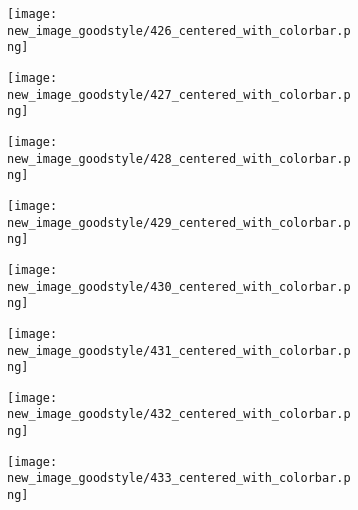 \documentclass[a4paper,12pt]{article}
\begin{document}
\begin{figure}[H]
  \begin{subfigure}{0.11\textwidth}
    \texttt{[image: new\_image\_goodstyle/426\_centered\_with\_colorbar.png]}
  \end{subfigure}
  \hfill
  \begin{subfigure}{0.11\textwidth}
    \texttt{[image: new\_image\_goodstyle/427\_centered\_with\_colorbar.png]}
  \end{subfigure}
  \hfill
  \begin{subfigure}{0.11\textwidth}
    \texttt{[image: new\_image\_goodstyle/428\_centered\_with\_colorbar.png]}
  \end{subfigure}
  \hfill
  \begin{subfigure}{0.11\textwidth}
    \texttt{[image: new\_image\_goodstyle/429\_centered\_with\_colorbar.png]}
  \end{subfigure}
  \hfill
  \begin{subfigure}{0.11\textwidth}
    \texttt{[image: new\_image\_goodstyle/430\_centered\_with\_colorbar.png]}
  \end{subfigure}
  \hfill
  \begin{subfigure}{0.11\textwidth}
    \texttt{[image: new\_image\_goodstyle/431\_centered\_with\_colorbar.png]}
  \end{subfigure}
  \hfill
  \begin{subfigure}{0.11\textwidth}
    \texttt{[image: new\_image\_goodstyle/432\_centered\_with\_colorbar.png]}
  \end{subfigure}
  \hfill
  \begin{subfigure}{0.11\textwidth}
    \texttt{[image: new\_image\_goodstyle/433\_centered\_with\_colorbar.png]}
  \end{subfigure}
  \hfill
\end{figure}
\end{document}
